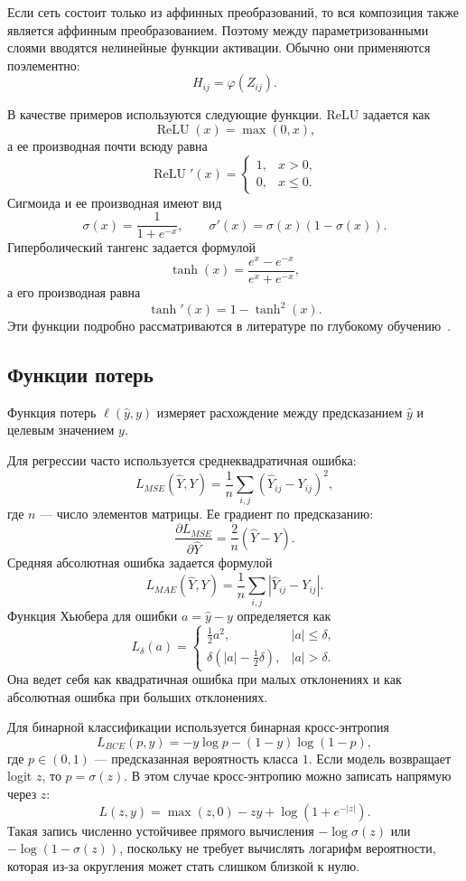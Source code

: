 \documentclass{article}
\begin{document}
Если сеть состоит только из аффинных преобразований, то вся композиция
также является аффинным преобразованием. Поэтому между
параметризованными слоями вводятся нелинейные функции активации.
Обычно они применяются поэлементно:
\[
    H_{ij} = \varphi(Z_{ij}).
\]

В качестве примеров используются следующие функции. ReLU задается как
\[
    \operatorname{ReLU}(x) = \max(0, x),
\]
а ее производная почти всюду равна
\[
    \operatorname{ReLU}'(x) =
    \begin{cases}
        1, & x > 0,\\
        0, & x \leq 0.
    \end{cases}
\]
Сигмоида и ее производная имеют вид
\[
    \sigma(x) =
    \frac{1}{1 + e^{-x}},
    \qquad
    \sigma'(x) =
    \sigma(x)(1-\sigma(x)).
\]
Гиперболический тангенс задается формулой
\[
    \tanh(x) =
    \frac{e^x - e^{-x}}{e^x + e^{-x}},
\]
а его производная равна
\[
    \tanh'(x) = 1 - \tanh^2(x).
\]
Эти функции подробно рассматриваются в литературе по
глубокому обучению~\cite{goodfellow2016deep}.

\subsection{Функции потерь}

Функция потерь $\ell(\hat{y}, y)$ измеряет расхождение между
предсказанием $\hat{y}$ и целевым значением $y$.

Для регрессии часто используется среднеквадратичная ошибка:
\[
    L_{MSE}(\hat{Y}, Y) =
    \frac{1}{n}
    \sum_{i,j}
    (\hat{Y}_{ij} - Y_{ij})^2,
\]
где $n$ --- число элементов матрицы. Ее градиент по предсказанию:
\[
    \frac{\partial L_{MSE}}{\partial \hat{Y}}
    =
    \frac{2}{n}(\hat{Y} - Y).
\]
Средняя абсолютная ошибка задается формулой
\[
    L_{MAE}(\hat{Y}, Y) =
    \frac{1}{n}
    \sum_{i,j}
    |\hat{Y}_{ij} - Y_{ij}|.
\]
Функция Хьюбера для ошибки $a = \hat{y} - y$ определяется как
\[
    L_{\delta}(a) =
    \begin{cases}
        \frac{1}{2}a^2, & |a| \leq \delta,\\
        \delta(|a| - \frac{1}{2}\delta), & |a| > \delta.
    \end{cases}
\]
Она ведет себя как квадратичная ошибка при малых отклонениях и как
абсолютная ошибка при больших отклонениях.

Для бинарной классификации используется бинарная кросс-энтропия
\[
    L_{BCE}(p, y)
    =
    -y\log p
    -(1-y)\log(1-p),
\]
где $p \in (0,1)$ --- предсказанная вероятность класса $1$.
Если модель возвращает logit $z$, то $p=\sigma(z)$. В этом случае
кросс-энтропию можно записать напрямую через $z$:
\[
    L(z, y)
    =
    \max(z, 0) - zy + \log(1 + e^{-|z|}).
\]
Такая запись численно устойчивее прямого вычисления
$-\log \sigma(z)$ или $-\log(1-\sigma(z))$, поскольку не требует
вычислять логарифм вероятности, которая из-за округления может стать
слишком близкой к нулю.
\end{document}
